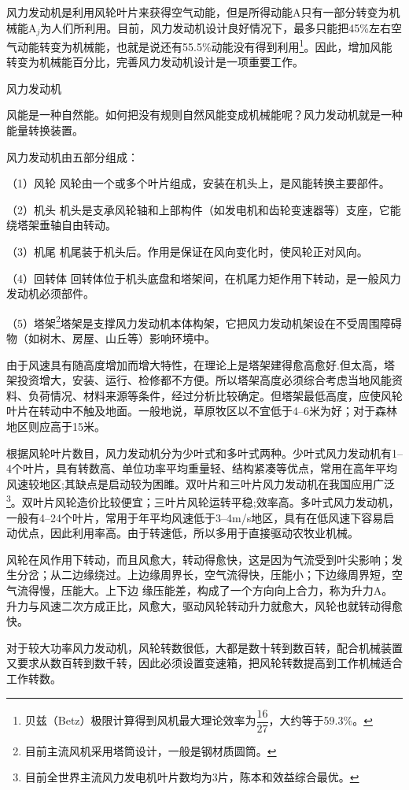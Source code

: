 \documentclass{ctexbook}
\begin{document}
风力发动机是利用风轮叶片来获得空气动能，但是所得动能A只有一部分转变为机械能A$_j$为人们所利用。目前，风力发动机设计良好情况下，最多只能把45\%左右空气动能转变为机械能，也就是说还有55.5\%动能没有得到利用\footnote{贝兹（Betz）极限计算得到风机最大理论效率为$\dfrac{16}{27}$，大约等于59.3\%。}。因此，增加风能转变为机械能百分比，完善风力发动机设计是一项重要工作。

风力发动机

风能是一种自然能。如何把没有规则自然风能变成机械能呢？风力发动机就是一种能量转换装置。

风力发动机由五部分组成：

（1）风轮 风轮由一个或多个叶片组成，安装在机头上，是风能转换主要部件。

（2）机头 机头是支承风轮轴和上部构件（如发电机和齿轮变速器等）支座，它能绕塔架垂轴自由转动。

（3）机尾 机尾装于机头后。作用是保证在风向变化时，使风轮正对风向。

（4）回转体 回转体位于机头底盘和塔架间，在机尾力矩作用下转动，是一般风力发动机必须部件。

（5）塔架\footnote{目前主流风机采用塔筒设计，一般是钢材质圆筒。}塔架是支撑风力发动机本体构架，它把风力发动机架设在不受周围障碍物（如树木、房屋、山丘等）影响环境中。

由于风速具有随高度增加而增大特性，在理论上是塔架建得愈高愈好.但太高，塔架投资增大，安装、运行、检修都不方便。所以塔架高度必须综合考虑当地风能资料、负荷情况、材料来源等条件，经过分析比较确定。但塔架最低高度，应使风轮叶片在转动中不触及地面。一般地说，草原牧区以不宜低于4--6米为好；对于森林地区则应高于15米。

根据风轮叶片数目，风力发动机分为少叶式和多叶式两种。少叶式风力发动机有1--4个叶片，具有转数高、单位功率平均重量轻、结构紧凑等优点，常用在高年平均风速较地区;其缺点是启动较为困雎。双叶片和三叶片风力发动机在我国应用广泛\footnote{目前全世界主流风力发电机叶片数均为3片，陈本和效益综合最优。}。双叶片风轮造价比较便宜；三叶片风轮运转平稳;效率高。多叶式风力发动机，一般有4--24个叶片，常用于年平均风速低于3--4m/s地区，具有在低风速下容易启动优点，因此利用率高。由于转速低，所以多用于直接驱动农牧业机械。

风轮在风作用下转动，而且风愈大，转动得愈快，这是因为气流受到叶尖影响；发生分岔；从二边缘绕过。上边缘周界长，空气流得快，压能小；下边缘周界短，空气流得慢，压能大。上下边
缘压能差，构成了一个方向向上合力，称为升力A。升力与风速二次方成正比，风愈大，驱动风轮转动升力就愈大，风轮也就转动得愈快。

对于较大功率风力发动机，风轮转数很低，大都是数十转到数百转，配合机械装置又要求从数百转到数千转，因此必须设置变速箱，把风轮转数提高到工作机械适合工作转数。
\end{document}
